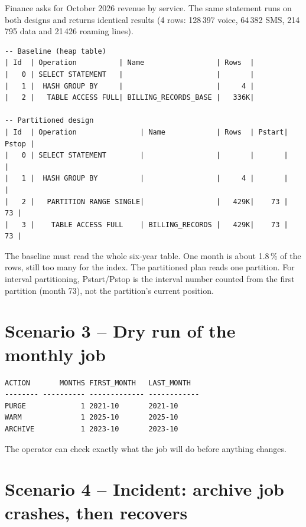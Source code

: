 Finance asks for October 2026 revenue by service. The same statement runs on both designs and
returns identical results (4 rows: 128\,397 voice, 64\,382 SMS, 214\,795 data and 21\,426
roaming lines).

\needspace{0.3\textheight}
\begin{lstlisting}[style=console, caption={Execution plans of the same query on both designs}]
-- Baseline (heap table)
| Id  | Operation          | Name                 | Rows  |
|   0 | SELECT STATEMENT   |                      |       |
|   1 |  HASH GROUP BY     |                      |     4 |
|   2 |   TABLE ACCESS FULL| BILLING_RECORDS_BASE |   336K|

-- Partitioned design
| Id  | Operation               | Name            | Rows  | Pstart| Pstop |
|   0 | SELECT STATEMENT        |                 |       |       |       |
|   1 |  HASH GROUP BY          |                 |     4 |       |       |
|   2 |   PARTITION RANGE SINGLE|                 |   429K|    73 |    73 |
|   3 |    TABLE ACCESS FULL    | BILLING_RECORDS |   429K|    73 |    73 |
\end{lstlisting}

The baseline must read the whole six-year table. One month is about 1.8\,\% of the rows,
still too many for the  index. The partitioned plan reads one partition. For
interval partitioning, Pstart/Pstop is the interval number counted from the first partition
(month 73), not the partition's current position.

\section{Scenario 3 -- Dry run of the monthly job}

\needspace{0.3\textheight}
\begin{lstlisting}[style=console, caption={\code{exec dlm\_pkg.run\_lifecycle(p\_dry\_run => true)} for 2026-11}]
ACTION       MONTHS FIRST_MONTH   LAST_MONTH
-------- ---------- ------------- ------------
PURGE             1 2021-10       2021-10
WARM              1 2025-10       2025-10
ARCHIVE           1 2023-10       2023-10
\end{lstlisting}

The operator can check exactly what the job will do before anything changes.

\section{Scenario 4 -- Incident: archive job crashes, then recovers}


